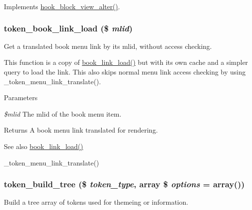 \label{token_8module_a5e30af58ef42a9fb1b3d3723e2796c9d}
Implements \hyperlink{group__hooks_ga65868e8e24bb04e5eb9e533c4d413b10}{hook\_\-block\_\-view\_\-alter()}. \hypertarget{token_8module_a0fa0866bc1e7362481041171d8d173a1}{
\subsubsection[{token\_\-book\_\-link\_\-load}]{\setlength{\rightskip}{0pt plus 5cm}token\_\-book\_\-link\_\-load (\$ {\em mlid})}}
\label{token_8module_a0fa0866bc1e7362481041171d8d173a1}
Get a translated book menu link by its mlid, without access checking.

This function is a copy of \hyperlink{book_8module_a996cf515cb6eb772f4190c144016c2bb}{book\_\-link\_\-load()} but with its own cache and a simpler query to load the link. This also skips normal menu link access checking by using \_\-token\_\-menu\_\-link\_\-translate().


\begin{DoxyParams}{Parameters}
\item[{\em \$mlid}]The mlid of the book menu item.\end{DoxyParams}
\begin{DoxyReturn}{Returns}
A book menu link translated for rendering.
\end{DoxyReturn}
\begin{DoxySeeAlso}{See also}
\hyperlink{book_8module_a996cf515cb6eb772f4190c144016c2bb}{book\_\-link\_\-load()} 

\_\-token\_\-menu\_\-link\_\-translate() 
\end{DoxySeeAlso}
\hypertarget{token_8module_ad32c69ba0eb229c02bf4b49227d49379}{
\subsubsection[{token\_\-build\_\-tree}]{\setlength{\rightskip}{0pt plus 5cm}token\_\-build\_\-tree (\$ {\em token\_\-type}, \/  array \$ {\em options} = {\ttfamily array()})}}
\label{token_8module_ad32c69ba0eb229c02bf4b49227d49379}
Build a tree array of tokens used for themeing or information.


